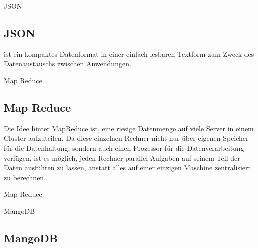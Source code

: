 \documentclass[11pt]{beamer}
\begin{document}
\begin{frame}{JSON}
\subsection{JSON}
 ist ein kompaktes Datenformat in einer einfach lesbaren Textform zum Zweck des Datenaustauschs zwischen Anwendungen.
\newpage 

\end{frame}

\begin{frame}{Map Reduce}
\subsection{Map Reduce}
Die Idee hinter MapReduce ist, eine riesige Datenmenge auf viele Server in einem Cluster aufzuteilen. Da diese einzelnen Rechner nicht nur über eigenen Speicher für die Datenhaltung, sondern auch einen Prozessor für die Datenverarbeitung verfügen, ist es möglich, jeden Rechner parallel Aufgaben auf seinem Teil der Daten ausführen zu lassen, anstatt alles auf einer einzigen Maschine zentralisiert zu berechnen. 
\end{frame}

\begin{frame}{Map Reduce}
\begin{figure}
\end{figure}
\end{frame}

\begin{frame}{MangoDB}
\subsection{MangoDB}
\end{frame}
\end{document}
